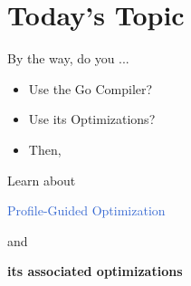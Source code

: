 \section{Today's Topic}
\begin{frame}{By the way, do you ...}
	\pause
	\large
	\begin{itemize}[<+->]
		\item[\emoji{woman-raising-hand}] Use the Go Compiler?

		\item[\large \emoji{woman-raising-hand}] {\large Use its Optimizations?}

		\item[] Then,

	\end{itemize}
\end{frame}

\begin{frame}
	\frametitlesec
	\Large
	\semibf
	\centering

	\pause

	Learn about\pause

	\vspace*{15pt}
	{\boldslant \textcolor{highlight}{Profile-Guided Optimization}}\pause
	\vspace*{6pt}

	and
	\vspace*{10pt}

	\textcolor{subhighlight}{\bf {}its associated optimizations}
\end{frame}
